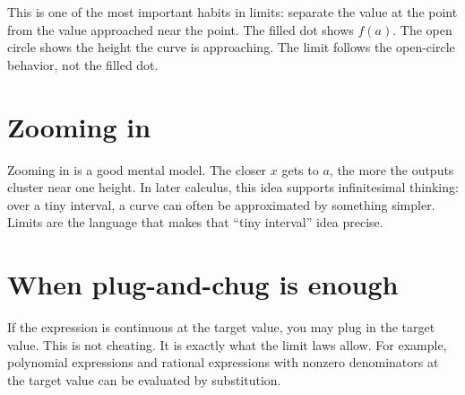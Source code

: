 \documentclass[11pt,oneside]{book}
\begin{document}
This is one of the most important habits in limits: separate the value at the point from the value approached near the point. The filled dot shows $f(a)$. The open circle shows the height the curve is approaching. The limit follows the open-circle behavior, not the filled dot.

\section*{Zooming in}
\begin{center}
\end{center}

Zooming in is a good mental model. The closer $x$ gets to $a$, the more the outputs cluster near one height. In later calculus, this idea supports infinitesimal thinking: over a tiny interval, a curve can often be approximated by something simpler. Limits are the language that makes that ``tiny interval'' idea precise.

\section*{When plug-and-chug is enough}
If the expression is continuous at the target value, you may plug in the target value. This is not cheating. It is exactly what the limit laws allow. For example, polynomial expressions and rational expressions with nonzero denominators at the target value can be evaluated by substitution.
\end{document}
